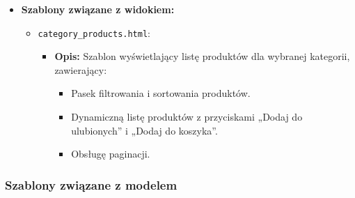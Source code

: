 \documentclass[12pt,a4paper,oneside]{article}
\theoremstyle{definition}
\numberwithin{equation}{section}
\begin{document}
\begin{itemize}
    \item \textbf{Szablony związane z widokiem:}
    \begin{itemize}
        \item \texttt{category\_products.html}:
        \begin{itemize}
            \item \textbf{Opis:} Szablon wyświetlający listę produktów dla wybranej kategorii, zawierający:
            \begin{itemize}
                \item Pasek filtrowania i sortowania produktów.
                \item Dynamiczną listę produktów z przyciskami „Dodaj do ulubionych” i „Dodaj do koszyka”.
                \item Obsługę paginacji.
            \end{itemize}
        \end{itemize}
    \end{itemize}
\end{itemize}


\subsubsection{Szablony związane z modelem}
\end{document}
